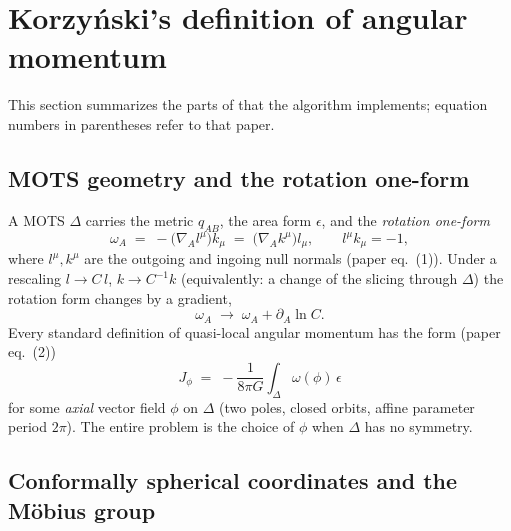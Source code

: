 \documentclass[11pt]{article}
\begin{document}
\section{Korzy\'nski's definition of angular momentum}
\label{sec:theory}

This section summarizes the parts of \cite{korzynski2007} that the algorithm
implements; equation numbers in parentheses refer to that paper.

\subsection{MOTS geometry and the rotation one-form}

A MOTS $\Delta$ carries the metric $q_{AB}$, the area form $\epsilon$, and the
\emph{rotation one-form}
\begin{equation}
  \omega_A \;=\; -\bigl(\nabla_A l^\mu\bigr) k_\mu
          \;=\; \bigl(\nabla_A k^\mu\bigr) l_\mu ,
  \qquad l^\mu k_\mu = -1,
  \label{eq:omegadef}
\end{equation}
where $l^\mu,k^\mu$ are the outgoing and ingoing null normals (paper eq.~(1)).
Under a rescaling $l\to C\,l$, $k\to C^{-1}k$ (equivalently: a change of the
slicing through $\Delta$) the rotation form changes by a gradient,
\begin{equation}
  \omega_A \;\to\; \omega_A + \partial_A \ln C .
  \label{eq:omegagauge}
\end{equation}
Every standard definition of quasi-local angular momentum has the form (paper
eq.~(2))
\begin{equation}
  J_\phi \;=\; -\frac{1}{8\pi G}\int_\Delta \omega(\phi)\,\epsilon
  \label{eq:Jphi}
\end{equation}
for some \emph{axial} vector field $\phi$ on $\Delta$ (two poles, closed
orbits, affine parameter period $2\pi$).  The entire problem is the choice of
$\phi$ when $\Delta$ has no symmetry.

\subsection{Conformally spherical coordinates and the M\"obius group}
\end{document}

